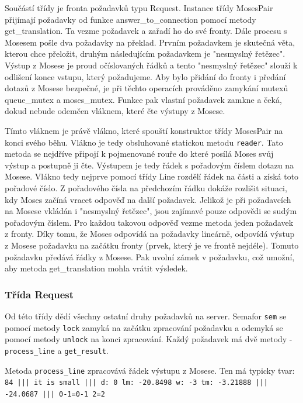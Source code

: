 \documentclass[12pt,a4paper]{report}
\begin{document}
Součástí třídy je fronta požadavků typu Request. Instance třídy MosesPair přijímají požadavky od funkce answer\_to\_connection pomocí metody get\_translation. Ta vezme požadavek a zařadí ho do své fronty. Dále procesu s Mosesem pošle dva požadavky na překlad. Prvním požadavkem je skutečná věta, kterou chce přeložit, druhým následujícím požadavkem je "nesmyslný řetězec". Výstup z Mosese je proud očíslovaných řádků a tento "nesmyslný řetězec" slouží k odlišení konce vstupu, který požadujeme. Aby bylo přidání do fronty i předání dotazů z Mosese bezpečné, je při těchto operacích prováděno zamykání mutexů queue\_mutex a moses\_mutex. Funkce pak vlastní požadavek zamkne a čeká, dokud nebude odemčen vláknem, které čte výstupy z Mosese.

Tímto vláknem je právě vlákno, které spouští konstruktor třídy MosesPair na konci svého běhu. Vlákno je tedy obsluhované statickou metodu {\tt reader}. Tato metoda se nejdříve připojí k pojmenované rouře do které posílá Moses svůj výstup a postupně ji čte. Výstupem je tedy řádek s pořadovým číslem dotazu na Mosese. Vlákno tedy nejprve pomocí třídy Line rozdělí řádek na části a získá toto pořadové číslo. Z pořadového čísla na předchozím řádku dokáže rozlišit situaci, kdy Moses začíná vracet odpověď na další požadavek. Jelikož je při požadavcích na Mosese vkládán i "nesmyslný řetězec", jsou zajímavé pouze odpovědi se sudým pořadovým číslem. Pro každou takovou odpověď vezme metoda jeden požadavek z fronty. Díky tomu, že Moses odpovídá na požadavky lineárně, odpovídá výstup z Mosese požadavku na začátku fronty (prvek, který je ve frontě nejdéle). Tomuto požadavku předává řádky z Mosese. Pak uvolní zámek v požadavku, což umožní, aby metoda get\_translation mohla vrátit výsledek.

\subsubsection{Třída Request}
Od této třídy dědí všechny ostatní druhy požadavků na server. Semafor {\tt sem} se pomocí metody {\tt lock} zamyká na začátku zpracování požadavku a odemyká se pomocí metody {\tt unlock} na konci zpracování. Každý požadavek má dvě metody - {\tt process\_line} a {\tt get\_result}.

Metoda {\tt process\_line} zpracovává řádek výstupu z Mosese. Ten má typicky tvar: \\

{\tt 84 ||| it is small  ||| d: 0 lm: -20.8498 w: -3 tm: -3.21888 ||| -24.0687 ||| 0-1=0-1 2=2 } \\
\end{document}
